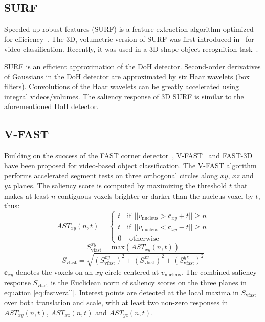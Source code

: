 \subsection{SURF}
Speeded up robust features (SURF) is a feature extraction algorithm optimized for efficiency~\cite{Bay2008}. The 3D, volumetric version of SURF was first introduced in~\cite{Willems2008} for video classification. Recently, it was used in a 3D shape object recognition task~\cite{Knopp2010}.

SURF is an efficient approximation of the DoH detector. Second-order derivatives of Gaussians in the DoH detector are approximated by six Haar wavelets (\ie box filters). Convolutions of the Haar wavelets can be greatly accelerated using integral videos/volumes. The saliency response of 3D SURF is similar to the aforementioned DoH detector. 

\subsection{V-FAST}

Building on the success of the FAST corner detector~\cite{Rosten2010}, V-FAST~\cite{Yu2010} and FAST-3D~\cite{Koelstra2009} have been proposed for video-based object classification. The V-FAST algorithm performs accelerated segment tests on three orthogonal circles along $xy$, $xz$ and $yz$ planes. The saliency score is computed by maximizing the threshold $t$ that makes at least $n$ contiguous voxels brighter or darker than the nucleus voxel by $t$, thus: 
\begin{equation}
AST_{xy}(n,t) = \left\{
\begin{array}{lc}
t & \textrm{if}~~||v_\textrm{nucleus} > \mathbf{c}_{xy} + t || \ge n \\
t & \textrm{if}~~||v_\textrm{nucleus} < \mathbf{c}_{xy} - t || \ge n \\
0 & \mbox{ otherwise }
\end{array}
\right.
\label{eq:fastast}
\end{equation}
\begin{equation}
S^{xy}_\textrm{vfast} = \mathrm{max}(AST_{xy}(n,t))
\label{eq:fast}
\end{equation}
\begin{equation}
S_\textrm{vfast} = \sqrt{(S^{xy}_\textrm{vfast})^2+(S^{xz}_\textrm{vfast})^2+(S^{yz}_\textrm{vfast})^2}
\label{eq:fastverall}
\end{equation}
$\mathbf{c}_{xy}$ denotes the voxels on an $xy$-circle centered at $v_\textrm{nucleus}$. The combined saliency response $S_{\textrm{vfast}}$ is the Euclidean norm of saliency scores on the three planes in equation \ref{eq:fastverall}. Interest points are detected at the local maxima in $S_{\textrm{vfast}}$ over both translation and scale, with at least two non-zero responses in $AST_{xy}(n,t)$, $AST_{xz}(n,t)$ and $AST_{yz}(n,t)$.

